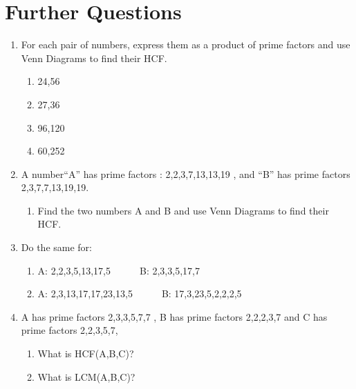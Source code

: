 \documentclass[a4paper,12pt]{article}
\begin{document}
\section{Further Questions}
\begin{tcolorbox}[colback=red!0!white, colframe=gray ,title=\subsection{Set One}\label{SetOne}]
\begin{enumerate}
	\item For each pair of numbers, express them as a product of prime factors and use Venn Diagrams to find their HCF.
	\begin{enumerate}
		\item 24,56
		\item 27,36
		\item 96,120
		\item 60,252
	\end{enumerate}
\item A number``A'' has prime factors : 2,2,3,7,13,13,19 , and ``B'' has prime factors 2,3,7,7,13,19,19.
\begin{enumerate}
	\item Find the two numbers A and B and use Venn Diagrams to find their HCF.
\end{enumerate}
\item	Do the same for:
\begin{enumerate}
	\item A: 2,2,3,5,13,17,5~~~~~~B: 2,3,3,5,17,7
	\item A: 2,3,13,17,17,23,13,5~~~~~~B: 17,3,23,5,2,2,2,5
\end{enumerate}
\item A has prime factors 2,3,3,5,7,7  , B has prime factors 2,2,2,3,7 and C has prime factors 2,2,3,5,7,
\begin{enumerate}
	\item What is HCF(A,B,C)?
	\item What is LCM(A,B,C)?
\end{enumerate}
\end{enumerate}
\end{tcolorbox}
\end{document}
